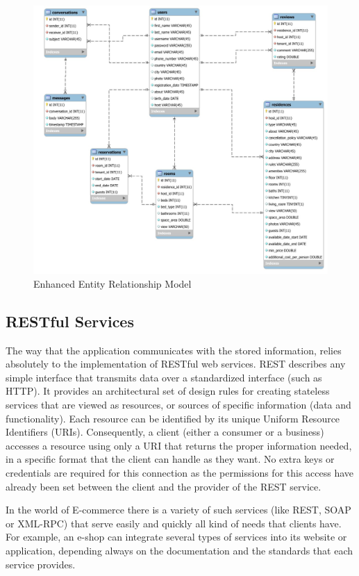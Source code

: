 \documentclass[12pt]{article}
\begin{document}
	\begin{figure} [H]
		\begin{center}
			\includegraphics [scale = 0.50] {sxesiakomonetelo.jpg}
			\caption{Enhanced Entity Relationship Model}
		\end{center}
	\end{figure}
	
	
	\subsection{RESTful Services}
	The way that the application communicates with the stored information, relies absolutely to the implementation of RESTful web services. REST describes any simple interface that transmits data over a standardized interface (such as HTTP). It provides an architectural set of design rules for creating stateless services that are viewed as resources, or sources of specific information (data and functionality). Each resource can be identified by its unique Uniform Resource Identifiers (URIs). Consequently, a client (either a consumer or a business) accesses a resource using only a URI that returns the proper information needed, in a specific format that the client can handle as they want. No extra keys or credentials are required for this connection as the permissions for this access have already been set between the client and the provider of the REST service.
	
	In the world of E-commerce there is a variety of such services (like REST, SOAP or XML-RPC) that serve easily and quickly all kind of needs that clients have. For example, an e-shop can integrate several types of services into its website or application, depending always on the documentation and the standards that each service provides.
	
\end{document}
